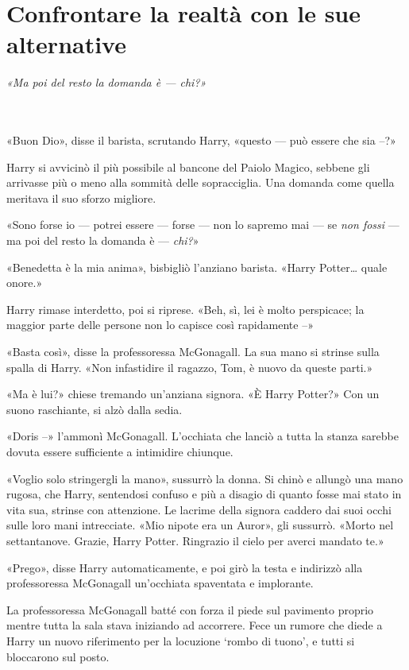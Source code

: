 
\chapter{Confrontare la realtà con le sue alternative}
\label{capitolo:3}

\emph{«Ma poi del resto la domanda è — chi?»}

~\\
~\\

«Buon Dio», disse il barista, scrutando Harry, «questo — può essere che sia –?»

Harry si avvicinò il più possibile al bancone del Paiolo Magico, sebbene gli arrivasse più o meno alla sommità delle sopracciglia. Una domanda come quella meritava il suo sforzo migliore.

«Sono forse io — potrei essere — forse — non lo sapremo mai — se \textit{non fossi} — ma poi del resto la domanda è — \textit{chi?}»

«Benedetta è la mia anima», bisbigliò l’anziano barista. «Harry Potter… quale onore.»

Harry rimase interdetto, poi si riprese. «Beh, sì, lei è molto perspicace; la maggior parte delle persone non lo capisce così rapidamente –»

«Basta così», disse la professoressa McGonagall. La sua mano si strinse sulla spalla di Harry. «Non infastidire il ragazzo, Tom, è nuovo da queste parti.»

«Ma è lui?» chiese tremando un’anziana signora. «È Harry Potter?» Con un suono raschiante, si alzò dalla sedia.

«Doris –» l’ammonì McGonagall. L’occhiata che lanciò a tutta la stanza sarebbe dovuta essere sufficiente a intimidire chiunque.

«Voglio solo stringergli la mano», sussurrò la donna. Si chinò e allungò una mano rugosa, che Harry, sentendosi confuso e più a disagio di quanto fosse mai stato in vita sua, strinse con attenzione. Le lacrime della signora caddero dai suoi occhi sulle loro mani intrecciate. «Mio nipote era un Auror», gli sussurrò. «Morto nel settantanove. Grazie, Harry Potter. Ringrazio il cielo per averci mandato te.»

«Prego», disse Harry automaticamente, e poi girò la testa e indirizzò alla professoressa McGonagall un’occhiata spaventata e implorante.

La professoressa McGonagall batté con forza il piede sul pavimento proprio mentre tutta la sala stava iniziando ad accorrere. Fece un rumore che diede a Harry un nuovo riferimento per la locuzione ‘rombo di tuono’, e tutti si bloccarono sul posto.

